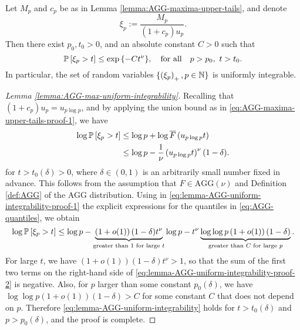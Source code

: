 \begin{lemma} \label{lemma:AGG-max-uniform-integrability}
Let $M_p$ and $c_p$ be as in Lemma \ref{lemma:AGG-maxima-upper-tails}, and denote 
$$
\xi_p := \frac{M_p}{(1+c_p)u_p}.
$$
Then there exist $p_0, t_0 > 0$, and an absolute constant $C>0$ such that
\begin{equation} \label{eq:lemma-AGG-uniform-integrability}
    \P\left[\xi_p > t \right]\le \exp{\{-Ct^\nu\}}, \quad \text{for all} \quad p>p_0,\ t>t_0.
\end{equation}
In particular, the set of random variables $\{\left(\xi_p\right)_+,p\in\N\}$ is uniformly integrable.
\end{lemma}
\begin{proof}[Lemma \ref{lemma:AGG-max-uniform-integrability}]
Recalling that $(1+c_p)u_p = u_{p\log{p}}$, and by applying the union bound as in \eqref{eq:AGG-maxima-upper-tails-proof-1}, we have
\begin{align}
    \log \P\left[\xi_p > t\right] 
        &\le \log p + \log{\overline{F}\left(u_{p\log{p}}t\right)} \nonumber \\
        &\le \log p - \frac{1}{\nu}\left(u_{p\log{p}}t\right)^\nu(1-\delta). \label{eq:lemma-AGG-uniform-integrability-proof-1}
\end{align}
for $t > t_0(\delta)>0$, where $\delta\in(0,1)$ is an arbitrarily small number fixed in advance. 
This follows from the assumption that $F\in\text{AGG}(\nu)$ and Definition \ref{def:AGG} of the AGG distribution.
Using in \eqref{eq:lemma-AGG-uniform-integrability-proof-1} the explicit expressions for the quantiles in \eqref{eq:AGG-quantiles}, we obtain
\begin{equation} \label{eq:lemma-AGG-uniform-integrability-proof-2}
    \log \P\left[\xi_p > t\right] \le \log p - \underbrace{\left(1+o(1)\right)(1-\delta)t^\nu}_{\text{greater than }1\text{ for large }t}\log{p} - t^\nu\underbrace{\log{\log{p}}\left(1+o(1)\right)(1-\delta)}_{\text{greater than }C\text{ for large }p}.
\end{equation}
For large $t$, we have $\left(1+o(1)\right)(1-\delta)t^\nu > 1$, so that the sum of the first two terms on the right-hand side of \eqref{eq:lemma-AGG-uniform-integrability-proof-2} is negative.
Also, for $p$ larger than some constant $p_0(\delta)$, we have $\log{\log{p}}\left(1+o(1)\right)(1-\delta) > C$ for some constant $C$ that does not depend on $p$.
Therefore \eqref{eq:lemma-AGG-uniform-integrability} holds for $t>t_0(\delta)$ and $p>p_0(\delta)$, and the proof is complete.
\end{proof}

